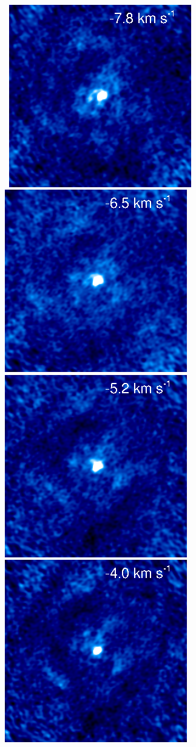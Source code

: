 \documentclass[preprint2]{aastex}
\begin{document}
\begin{figure}[hbt!]
{         }
\\
\mbox{
          \includegraphics[]{chan33.ps}
          \includegraphics[]{chan32.ps}
          \includegraphics[]{chan31.ps}
          \includegraphics[]{chan30.ps}
}
\end{figure}
\end{document}

